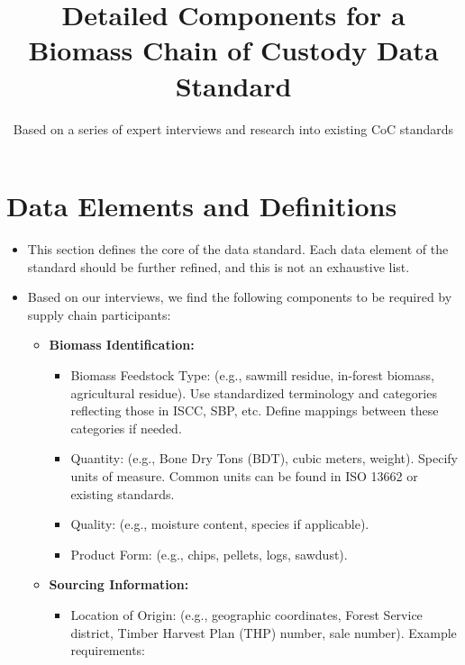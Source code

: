 \documentclass[a4paper, 11pt]{article}
\begin{document}
\title{Detailed Components for a Biomass Chain of Custody Data Standard}
\author{Based on a series of expert interviews and research into existing CoC standards} %
\date{} %
\maketitle

\section{Data Elements and Definitions}

\begin{itemize}
    \item This section defines the core of the data standard. Each data element of the standard should be further refined, and this is not an exhaustive list.
    \item Based on our interviews, we find the following components to be required by supply chain participants:
        \begin{itemize} %
            \item \textbf{Biomass Identification:}
                \begin{itemize} %
                    \item Biomass Feedstock Type: (e.g., sawmill residue, in-forest biomass, agricultural residue). Use standardized terminology and categories reflecting those in ISCC, SBP, etc. Define mappings between these categories if needed.
                    \item Quantity: (e.g., Bone Dry Tons (BDT), cubic meters, weight). Specify units of measure. Common units can be found in ISO 13662 or existing standards. 
                    \item Quality: (e.g., moisture content, species if applicable).
                    \item Product Form: (e.g., chips, pellets, logs, sawdust).
                \end{itemize}
            \item \textbf{Sourcing Information:}
                \begin{itemize} 
                    \item Location of Origin: (e.g., geographic coordinates, Forest Service district, Timber Harvest Plan (THP) number, sale number). Example requirements:
                        \begin{itemize}

\end{itemize}
\end{itemize}
\end{itemize}
\end{itemize}
\end{document}
